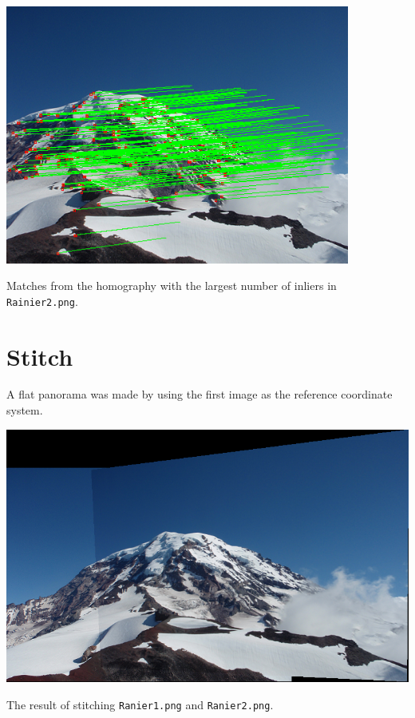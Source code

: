 \documentclass[letterpaper]{article}
\begin{document}
\begin{center}
  \includegraphics[width=0.85\textwidth]{3b.png}
  
  Matches from the homography with the largest number of inliers in
  \texttt{Rainier2.png}.
\end{center}

\section{Stitch}
\label{sec:stitch}

A flat panorama was made by using the first image as the reference coordinate
system.

\begin{center}
  \includegraphics[width=\textwidth]{4.png}
  
  The result of stitching \texttt{Ranier1.png} and \texttt{Ranier2.png}.
\end{center}
\end{document}
